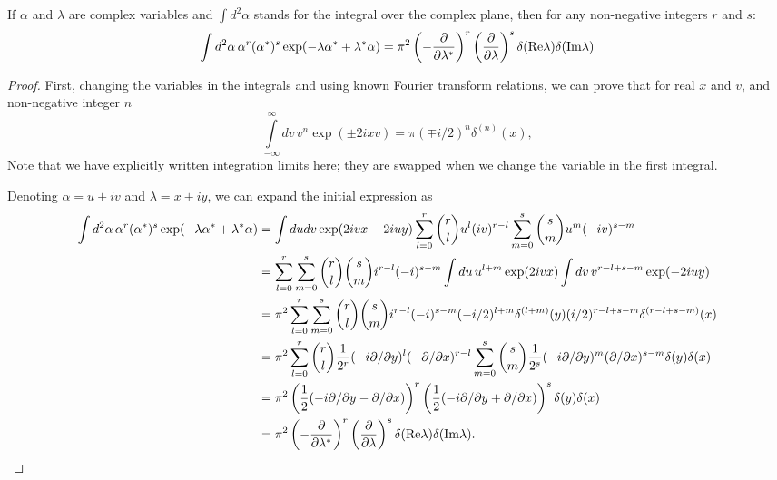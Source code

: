 \begin{lemma}
\label{lmm:formalism:c-numbers:fourier-of-moments}
If $\alpha$ and $\lambda$ are complex variables and $\int d^2\alpha$ stands for the integral over the complex plane, then for any non-negative integers $r$ and $s$:
\[
	\int d^2\alpha\, \alpha^r (\alpha^*)^s \exp(-\lambda \alpha^* + \lambda^* \alpha)
	= \pi^2
		\left( -\frac{\partial}{\partial \lambda^*} \right)^r
		\left( \frac{\partial}{\partial \lambda} \right)^s
		\delta(\mathrm{Re} \lambda) \delta(\mathrm{Im} \lambda)
\]
\end{lemma}
\begin{proof}
First, changing the variables in the integrals and using known Fourier transform relations, we can prove that for real $x$ and $v$, and non-negative integer $n$
\[
	\int\limits_{-\infty}^{\infty} dv\, v^n \exp(\pm 2 i x v)
	= \pi (\mp i / 2)^n \delta^{(n)}(x),
\]
Note that we have explicitly written integration limits here;
they are swapped when we change the variable in the first integral.

Denoting $\alpha = u + iv$ and $\lambda = x + iy$, we can expand the initial expression as
\begin{equation*}
\begin{split}
	\int d^2\alpha\, \alpha^r (\alpha^*)^s \exp(-\lambda \alpha^* + \lambda^* \alpha)
	& = \int du dv \exp(2ivx - 2iuy)
		\sum_{l=0}^r \binom{r}{l} u^l (iv)^{r-l}
		\sum_{m=0}^s \binom{s}{m} u^m (-iv)^{s-m} \\
	& = \sum_{l=0}^r \sum_{m=0}^s \binom{r}{l} \binom{s}{m}
		i^{r-l} (-i)^{s-m}
		\int du\, u^{l+m} \exp(2ivx)
		\int dv\, v^{r-l+s-m} \exp(-2iuy) \\
	& = \pi^2 \sum_{l=0}^r \sum_{m=0}^s \binom{r}{l} \binom{s}{m}
		i^{r-l} (-i)^{s-m}
		(-i/2)^{l+m} \delta^{(l+m)}(y)
		(i/2)^{r-l+s-m} \delta^{(r-l+s-m)}(x) \\
	& = \pi^2
		\sum_{l=0}^r \binom{r}{l}
			\frac{1}{2^r}
			(-i \partial / \partial y)^l
			(-\partial / \partial x)^{r-l}
		\sum_{m=0}^s \binom{s}{m}
			\frac{1}{2^s}
			(-i \partial / \partial y)^m
			(\partial / \partial x)^{s-m}
		\delta(y) \delta(x) \\
	& = \pi^2
		\left( \frac{1}{2} (-i \partial / \partial y - \partial / \partial x) \right)^r
		\left( \frac{1}{2} (-i \partial / \partial y + \partial / \partial x) \right)^s
		\delta(y) \delta(x) \\
	& = \pi^2
		\left( -\frac{\partial}{\partial \lambda^*} \right)^r
		\left( \frac{\partial}{\partial \lambda} \right)^s
		\delta(\mathrm{Re} \lambda) \delta(\mathrm{Im} \lambda).
		\qedhere
\end{split}
\end{equation*}
\end{proof}


